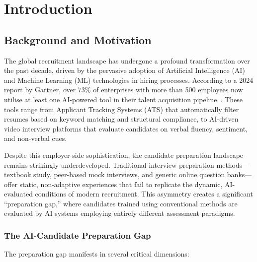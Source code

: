 \documentclass[12pt,a4paper,oneside]{report}
\begin{document}
\newpage
{}
\setcounter{page}{1}
\pagestyle{fancy}

\chapter{Introduction}
\label{ch:introduction}

\section{Background and Motivation}
\label{sec:background}

The global recruitment landscape has undergone a profound transformation over the past decade, driven by the pervasive adoption of Artificial Intelligence (AI) and Machine Learning (ML) technologies in hiring processes. According to a 2024 report by Gartner, over 73\% of enterprises with more than 500 employees now utilise at least one AI-powered tool in their talent acquisition pipeline~\cite{ref_gartner2024}. These tools range from Applicant Tracking Systems (ATS) that automatically filter resumes based on keyword matching and structural compliance, to AI-driven video interview platforms that evaluate candidates on verbal fluency, sentiment, and non-verbal cues.

Despite this employer-side sophistication, the candidate preparation landscape remains strikingly underdeveloped. Traditional interview preparation methods---textbook study, peer-based mock interviews, and generic online question banks---offer static, non-adaptive experiences that fail to replicate the dynamic, AI-evaluated conditions of modern recruitment. This asymmetry creates a significant ``preparation gap,'' where candidates trained using conventional methods are evaluated by AI systems employing entirely different assessment paradigms.

\subsection{The AI-Candidate Preparation Gap}
The preparation gap manifests in several critical dimensions:
\end{document}
